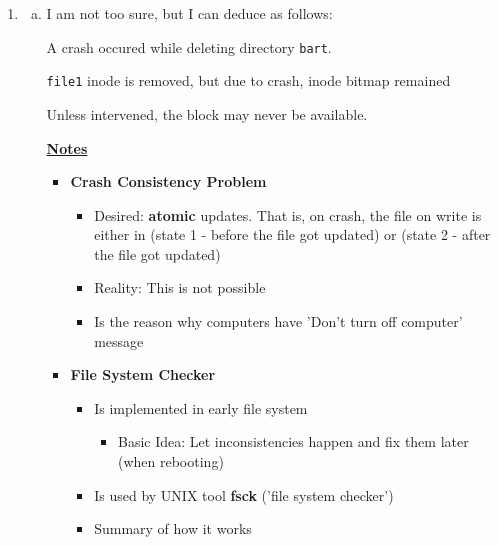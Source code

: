 \documentclass[12pt]{article}
\begin{document}
\begin{enumerate}[1.]
    \item

    \begin{enumerate}[a)]
        \item

        \bigskip

        I am not too sure, but I can deduce as follows:

        \bigskip

        A crash occured while deleting directory \texttt{bart}.

        \bigskip

        \texttt{file1} inode is removed, but due to crash, inode bitmap remained

        \bigskip

        Unless intervened, the block may never be available.

        \bigskip

        \underline{\textbf{Notes}}

        \begin{itemize}
            \item \textbf{Crash Consistency Problem}

            \begin{itemize}
                \item Desired: \textbf{atomic} updates. That is, on crash,
                the file on write is either in (state 1 - before the file got updated)
                or (state 2 - after the file got updated)
                \item Reality: This is not possible
                \item Is the reason why computers have 'Don't turn off computer' message
            \end{itemize}

            \item \textbf{File System Checker}

            \begin{itemize}
                \item Is implemented in early file system
                \begin{itemize}
                    \item Basic Idea: Let inconsistencies happen and fix them later (when rebooting)
                \end{itemize}
                \item Is used by UNIX tool \textbf{fsck} ('file system checker')
                \item Summary of how it works


\end{itemize}
\end{itemize}
\end{enumerate}
\end{enumerate}
\end{document}
